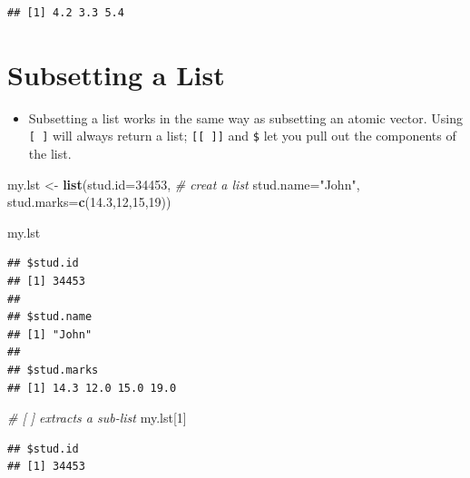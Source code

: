 \documentclass[]{book}
\newenvironment{Shaded}{\begin{snugshade}}{\end{snugshade}}
\newcommand{\KeywordTok}[1]{\textcolor[rgb]{0.13,0.29,0.53}{\textbf{{#1}}}}
\newcommand{\DataTypeTok}[1]{\textcolor[rgb]{0.13,0.29,0.53}{{#1}}}
\newcommand{\DecValTok}[1]{\textcolor[rgb]{0.00,0.00,0.81}{{#1}}}
\newcommand{\FloatTok}[1]{\textcolor[rgb]{0.00,0.00,0.81}{{#1}}}
\newcommand{\StringTok}[1]{\textcolor[rgb]{0.31,0.60,0.02}{{#1}}}
\newcommand{\CommentTok}[1]{\textcolor[rgb]{0.56,0.35,0.01}{\textit{{#1}}}}
\newcommand{\NormalTok}[1]{{#1}}
\providecommand{\tightlist}{%
  \setlength{\itemsep}{0pt}\setlength{\parskip}{0pt}}
\begin{document}
\begin{verbatim}
## [1] 4.2 3.3 5.4
\end{verbatim}

\section{Subsetting a List}\label{subsetting-a-list}

\begin{itemize}
\tightlist
\item
  Subsetting a list works in the same way as subsetting an atomic
  vector. Using \texttt{{[}\ {]}} will always return a list;
  \texttt{{[}{[}\ {]}{]}} and \texttt{\$} let you pull out the
  components of the list.
\end{itemize}

\begin{Shaded}
\begin{Highlighting}[]
\NormalTok{my.lst <-}\StringTok{ }\KeywordTok{list}\NormalTok{(}\DataTypeTok{stud.id=}\DecValTok{34453}\NormalTok{,      }\CommentTok{# creat a list}
               \DataTypeTok{stud.name=}\StringTok{"John"}\NormalTok{, }
               \DataTypeTok{stud.marks=}\KeywordTok{c}\NormalTok{(}\FloatTok{14.3}\NormalTok{,}\DecValTok{12}\NormalTok{,}\DecValTok{15}\NormalTok{,}\DecValTok{19}\NormalTok{))}
\end{Highlighting}
\end{Shaded}

\begin{Shaded}
\begin{Highlighting}[]
\NormalTok{my.lst}
\end{Highlighting}
\end{Shaded}

\begin{verbatim}
## $stud.id
## [1] 34453
## 
## $stud.name
## [1] "John"
## 
## $stud.marks
## [1] 14.3 12.0 15.0 19.0
\end{verbatim}

\begin{Shaded}
\begin{Highlighting}[]
\CommentTok{# [ ] extracts a sub-list }
\NormalTok{my.lst[}\DecValTok{1}\NormalTok{]}
\end{Highlighting}
\end{Shaded}

\begin{verbatim}
## $stud.id
## [1] 34453
\end{verbatim}
\end{document}
